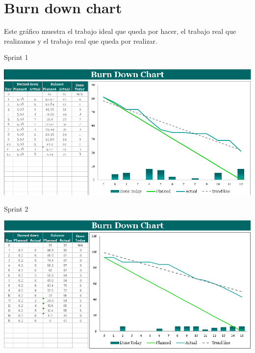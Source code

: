 \chapter{Burn down chart}

Este gráfico muestra el trabajo ideal que queda por hacer, el trabajo real que realizamos y el trabajo real que queda por realizar. 

\begin{table}[htbp]
Sprint 1
\end{table}

\centering
\includegraphics[width=1.20\textwidth]{img/BurnDownChart}\par\vspace{1cm}
\vspace{0.30cm}	

\begin{table}[htbp]
Sprint 2
\end{table}

\centering
\includegraphics[width=1.20\textwidth]{img/BurnDownChart2}\par\vspace{1cm}
\vspace{0.30cm}	

